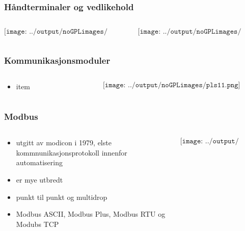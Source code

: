 \documentclass[aspectratio=169,xcolor=dvipsnames]{beamer}
\begin{document}
\begin{frame}
	\frametitle{Håndterminaler og vedlikehold}
	\begin{columns}
		\begin{column}{0.5\textwidth}

	$$\texttt{[image: ../output/noGPLimages/kap5x30]}$$

			
		\end{column}

		\begin{column}{0.5\textwidth}
	$$\texttt{[image: ../output/noGPLimages/kap5x29]}$$
		\end{column}
	\end{columns}
\end{frame}

\begin{frame}
	\frametitle{Kommunikasjonsmoduler}
	\begin{columns}
		\begin{column}{0.5\textwidth}
			\begin{itemize}
				\item item
			\end{itemize}

			
		\end{column}

		\begin{column}{0.5\textwidth}
	$$\texttt{[image: ../output/noGPLimages/pls11.png]}$$
		\end{column}
	\end{columns}
\end{frame}
\begin{frame}
	\frametitle{Modbus}
	\begin{columns}
		\begin{column}{0.5\textwidth}

			\begin{itemize}
				\item utgitt av modicon i 1979, elste kommnunikasjonsprotokoll innenfor automatisering
				\item er mye utbredt
				\item punkt til punkt og multidrop
				\item Modbus ASCII, Modbus Plus, Modbus RTU og Modubs TCP
			\end{itemize}

			
		\end{column}

		\begin{column}{0.5\textwidth}
	$$\texttt{[image: ../output/noGPLimages/kap5x79]}$$
		\end{column}
	\end{columns}
\end{frame}
\end{document}
